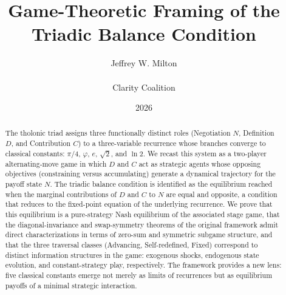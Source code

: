 \documentclass[12pt]{article}
\title{Game-Theoretic Framing of the Triadic Balance Condition}
\author{Jeffrey W. Milton\\\\[4pt]\small Clarity Coalition}
\date{2026}
\theoremstyle{definition}
\theoremstyle{remark}
\begin{document}
\maketitle

\begin{abstract}
The tholonic triad assigns three functionally distinct roles (Negotiation $N$,
Definition $D$, and Contribution $C$) to a three-variable recurrence whose branches
converge to classical constants: $\pi/4$, $\varphi$, $e$, $\sqrt{2}$, and $\ln 2$.
We recast this system as a two-player alternating-move game in which $D$ and $C$ act
as strategic agents whose opposing objectives (constraining versus accumulating) generate
a dynamical trajectory for the payoff state $N$.  The triadic balance condition is
identified as the equilibrium reached when the marginal contributions of $D$ and $C$ to
$N$ are equal and opposite, a condition that reduces to the fixed-point equation of the
underlying recurrence.  We prove that this equilibrium is a pure-strategy Nash
equilibrium of the associated stage game, that the diagonal-invariance and swap-symmetry
theorems of the original framework admit direct characterizations in terms of zero-sum
and symmetric subgame structure, and that the three traversal classes (Advancing,
Self-redefined, Fixed) correspond to distinct information structures in the game:
exogenous shocks, endogenous state evolution, and constant-strategy play, respectively.
The framework provides a new lens: five classical constants emerge not merely as limits
of recurrences but as equilibrium payoffs of a minimal strategic interaction.
\end{abstract}

\tableofcontents
\end{document}
